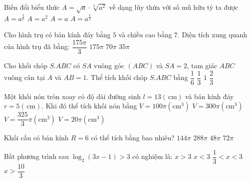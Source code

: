 \begin{ex}%
Biến đổi biểu thức $A=\sqrt{a} \cdot \sqrt[3]{a^2}$ về dạng lũy thừa với số mũ hữu tỷ ta được
\choice
{\True $A=a^{\frac{7}{6}}$}
{$A=a^2$}
{$A=a$}
{$A=a^{\frac{7}{2}}$}

\end{ex}
\begin{ex}%
Cho hình trụ có bán kính đáy bằng $5$ và chiều cao bằng $7$. Diện tích xung quanh của hình trụ đã bằng:
\choice
{$\dfrac{175\pi}{3}$}
{$175\pi$}
{\True $70\pi$}
{$35\pi$}

\end{ex}
\begin{ex}%
Cho khối chóp $S.ABC$ có $SA$ vuông góc $(ABC)$ và $SA=2$, tam giác $ABC$ vuông cân tại $A$ và $AB=1$. Thể tích khối chóp $S.ABC$ bằng
\choice
{$\dfrac{1}{6}$}
{\True $\dfrac{1}{3}$}
{$1$}
{$\dfrac{2}{3}$}

\end{ex}
\begin{ex}%
Một khối nón tròn xoay có độ dài đường sinh $l=13(\mathrm{\,cm})$ và bán kính đáy $r=5(\mathrm{\,cm})$. Khi đó thể tích khối nón bằng
\choice
{\True $V=100\pi\left(\mathrm{cm}^3\right)$}
{$V=300\pi\left(\mathrm{cm}^3\right)$}
{$V=\dfrac{325}{3} \pi\left(\mathrm{cm}^3\right)$}
{$V=20\pi\left(\mathrm{cm}^3\right)$}

\end{ex}
\begin{ex}%
Khối cầu có bán kính $R=6$ có thể tích bằng bao nhiêu?
\choice
{$144\pi$}
{\True $288\pi$}
{$48\pi$}
{$72\pi$}

\end{ex}
\begin{ex}%
Bất phương trình sau $\log_2(3 x-1)>3$ có nghiệm là:
\choice
{\True $x>3$}
{$x<3$}
{$\dfrac{1}{3}<x<3$}
{$x>\dfrac{10}{3}$}

\end{ex}
\begin{ex}%
{\vspace{-0.6cm}
}

\end{ex}
